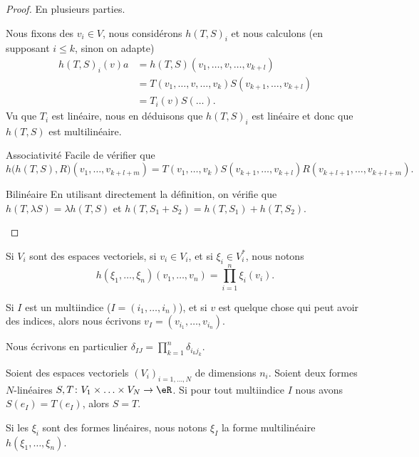 \begin{proof}
	En plusieurs parties.
	\begin{subproof}
		\spitem[multilinéaire]
		Nous fixons des \( v_i\in V\), nous considérons \( h(T,S)_i\) et nous calculons (en supposant \( i\leq k\), sinon on adapte)
		\begin{subequations}
			\begin{align}
				h(T,S)_i(v)a & =h(T,S)(v_1,\ldots,v,\ldots,v_{k+l})                  \\
				             & = T(v_1,\ldots,v,\ldots,v_k)S(v_{k+1},\ldots,v_{k+l}) \\
				             & =T_i(v)S(\ldots).
			\end{align}
		\end{subequations}
		Vu que \( T_i\) est linéaire, nous en déduisons que \( h(T,S)_i\) est linéaire et donc que \( h(T,S)\) est multilinéaire.
		\item[Associativité]
		Facile de vérifier que
		\begin{equation}
			h\big( h(T,S),R \big)(v_1,\ldots,v_{k+l+m})=T(v_1,\ldots,v_k)S(v_{k+1},\ldots,v_{k+l})R(v_{k+l+1},\ldots,v_{k+l+m}).
		\end{equation}
		\item[Bilinéaire]
		En utilisant directement la définition, on vérifie que \( h(T,\lambda S)=\lambda h(T,S)\) et \( h(T,S_1+S_2)=h(T,S_1)+h(T,S_2)\).
	\end{subproof}
\end{proof}

\begin{normaltext}
	Si \( V_i\) sont des espaces vectoriels, si \( v_i\in V_i\), et si \( \xi_i\in V_i^*\), nous notons
	\begin{equation}
		h(\xi_1,\ldots,\xi_n)(v_1,\ldots,v_n)=\prod_{i=1}^n\xi_i(v_i).
	\end{equation}

	Si \( I\) est un multiindice (\( I=(i_1,\ldots,i_n)\)), et si \( v\) est quelque chose qui peut avoir des indices, alors nous écrivons \( v_I=(v_{i_1},\ldots, v_{i_n})\).

	Nous écrivons en particulier \( \delta_{IJ}=\prod_{k=1}^n\delta_{i_kj_k}\).
\end{normaltext}


\begin{lemma}	\label{LEMooPUNAooUnQTpJ}
	Soient des espaces vectoriels \( (V_i)_{i=1,\ldots,N}\) de dimensions \( n_i\). Soient deux formes \( N\)-linéaires \(S,T \colon V_1\times \ldots \times V_N \to \eR  \). Si pour tout multiindice \( I\) nous avons \( S(e_I)=T(e_I)\), alors \( S=T\).

	Si les \( \xi_i\) sont des formes linéaires, nous notons \( \xi_I\) la forme multilinéaire \( h(\xi_1,\ldots,\xi_n)\).
\end{lemma}

